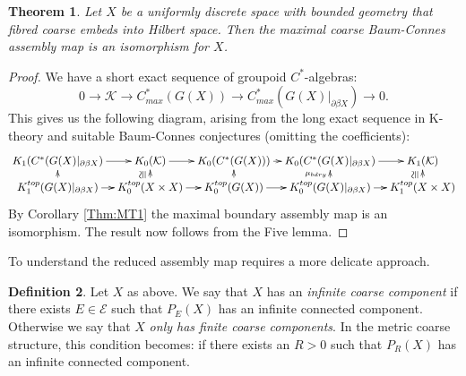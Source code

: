 \documentclass[preprint]{elsarticle}
\theoremstyle{plain}
\newtheorem{theorem}{Theorem}%
\theoremstyle{definition}%
\newtheorem{definition}[theorem]{Definition}%
\theoremstyle{remark}%
\newcommand{\ucong}{\rotatebox{90}{$\cong$}}
\begin{document}
\begin{theorem}\cite[Theorem 1.1]{FCEpaper}
Let $X$ be a uniformly discrete space with bounded geometry that fibred coarse embeds into Hilbert space. Then the maximal coarse Baum-Connes assembly map is an isomorphism for $X$.
\end{theorem}
\begin{proof}
We have a short exact sequence of groupoid $C^{*}$-algebras:
\begin{equation*}
0 \rightarrow \mathcal{K} \rightarrow C^{*}_{max}(G(X)) \rightarrow C^{*}_{max}(G(X)|_{\partial\beta X}) \rightarrow 0.
\end{equation*}
This gives us the following diagram, arising from the long exact sequence in K-theory and suitable Baum-Connes conjectures (omitting the coefficients):
\begin{equation*}
\xymatrix@=0.7em{
K_{1}(C^{*}(G(X)|_{\partial\beta X}) \ar[r] & K_{0}(\mathcal{K}) \ar[r]& K_{0}(C^{*}(G(X))) \ar[r]& K_{0}(C^{*}(G(X)|_{\partial\beta X})\ar[r] & K_{1}(\mathcal{K})  \\
K_{1}^{top}(G(X)|_{\partial\beta X}) \ar[r] \ar[u]& K_{0}^{top}(X \times X) \ar[r]\ar[u]^{\ucong}& K_{0}^{top}(G(X)) \ar[r]\ar[u]& K_{0}^{top}(G(X)|_{\partial\beta X}) \ar[r]\ar[u]^{\mu_{bdry}}& K_{1}^{top}(X \times X)\ar[u]^{\ucong}
}
\end{equation*}
By Corollary \ref{Thm:MT1} the maximal boundary assembly map is an isomorphism. The result now follows from the Five lemma.
\end{proof}

To understand the reduced assembly map requires a more delicate approach.

\begin{definition}
Let $X$ as above. We say that $X$ has an \textit{infinite coarse component} if there exists $E \in \mathcal{E}$ such that $P_{E}(X)$ has an infinite connected component. Otherwise we say that $X$ \textit{only has finite coarse components}. In the metric coarse structure, this condition becomes: if there exists an $R>0$ such that $P_{R}(X)$ has an infinite connected component.
\end{definition}
\end{document}
